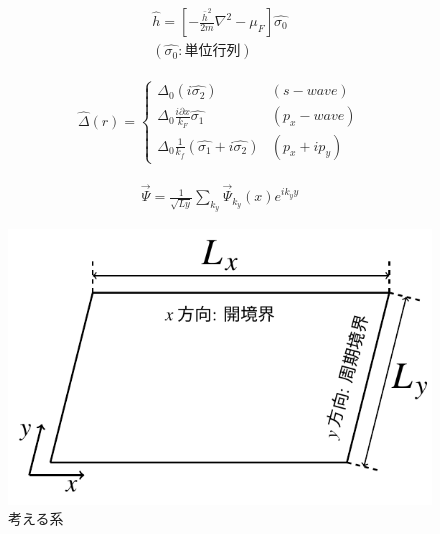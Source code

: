 \documentclass{jsarticle}
\begin{document}
		\begin{align}
			\hat{h}=\left[-\frac{\bar{h}^2}{2m}\nabla^2-\mu_F \right]\hat{\sigma_0}　\\
			\left( \hat{\sigma_0}:単位行列 \right)
		\end{align}

		\begin{align}
			\hat{\Delta}(r)=
			\begin{cases}
				\Delta_0 \left( i \hat{\sigma_2} \right) & \left( s-wave \right) \\
				\Delta_0\frac{i\partial x}{k_F}\hat{\sigma_1} & \left( p_x-wave \right) \\
				\Delta_0\frac{1}{k_f} \left( \hat{\sigma_1}+i\hat{\sigma_2} \right) & \left( p_x+ip_y \right)
			\end{cases}
			\label{Delta}
		\end{align}

		\begin{align}
			\vec{\Psi}=\frac{1}{\sqrt{Ly}}\sum_{k_y} \vec{\Psi}_{k_y}(x) e^{ik_yy}
		\end{align}

		\begin{figure}[H]
			\centering
			\includegraphics[scale=1]{figure1}
			\caption{考える系}
			\label{system}
		\end{figure}
\end{document}
